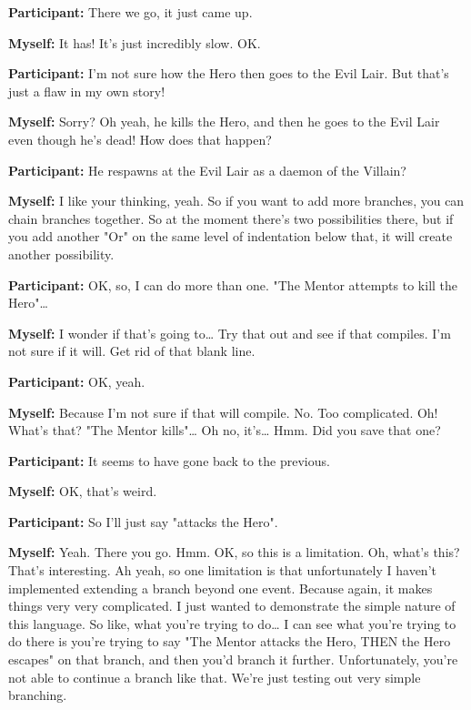 \documentclass[11pt]{report}
\newcommand{\llabel}[1]{\hypertarget{llineno:#1}{\linelabel{#1}}}
\begin{document}
\begin{linenumbers}
\textbf{Participant:} There we go, it just came up.

\textbf{Myself:} It has! It's just incredibly slow. OK.

\textbf{Participant:} I'm not sure how the Hero then goes to the Evil Lair. But
that's just a flaw in my own story!\llabel{lne:feature4a}

\textbf{Myself:} Sorry? Oh yeah, he kills the Hero, and then he goes to the Evil Lair even though he's dead! How does that happen?

\textbf{Participant:} He respawns at the Evil Lair as a daemon of the Villain?

\textbf{Myself:} I like your thinking, yeah. So if you want to add more branches, you can chain branches together. So at the moment there's two possibilities there, but if you add another "Or" on the same level of indentation below that, it will create another possibility.

\textbf{Participant:} OK, so, I can do more than one. "The Mentor attempts to kill the Hero"\ldots{}

\textbf{Myself:} I wonder if that's going to\ldots{} Try that out and see if that compiles. I'm not sure if it will. Get rid of that blank line.

\textbf{Participant:} OK, yeah.

\textbf{Myself:} Because I'm not sure if that will compile. No. Too complicated. Oh! What's that? "The Mentor kills"\ldots{} Oh no, it's\ldots{} Hmm. Did you save that one?

\textbf{Participant:} It seems to have gone back to the previous.

\textbf{Myself:} OK, that's weird.

\textbf{Participant:} So I'll just say "attacks the Hero".

\textbf{Myself:} Yeah. There you go. Hmm. OK, so this is a limitation. Oh,
what's this? That's interesting. Ah yeah, so one limitation is that
unfortunately I haven't implemented extending a branch beyond one event. Because
again, it makes things very very complicated. I just wanted to demonstrate the
simple nature of this language. So like, what you're trying to do\ldots{} I can
see what you're trying to do there is you're trying to say "The Mentor attacks
the Hero, THEN the Hero escapes" on that branch, and then you'd branch it
further. Unfortunately, you're not able to continue a branch like that. We're
just testing out very simple branching.\llabel{lne:bug2a}


\end{linenumbers}
\end{document}
